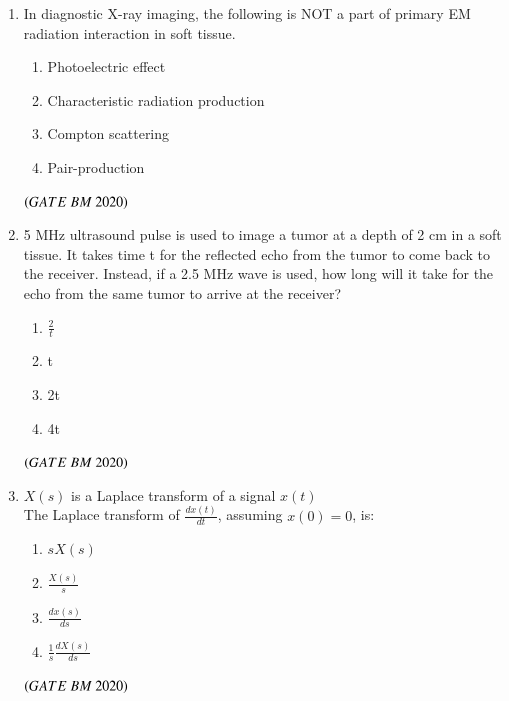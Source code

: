 \documentclass[journal,12pt,onecolumn]{IEEEtran}
\theoremstyle{remark}
\begin{document}
\begin{enumerate}
\item In diagnostic X-ray imaging, the following is NOT a part of primary EM radiation interaction in soft tissue.
\begin{enumerate}[label=\alph*)] 
\item\hspace{0.5cm}Photoelectric effect
\item\hspace{0.5cm}Characteristic radiation production
\item\hspace{0.5cm}Compton scattering
\item\hspace{0.5cm}Pair-production
\end{enumerate}
\hfill $\brak{GATE\ BM\ 2020}$\\
 
\item 5 MHz ultrasound pulse is used to image a tumor at a depth of 2 cm in a soft tissue. It takes time t for the reflected echo from the tumor to come back to the receiver. Instead, if a 2.5 MHz wave is used, how long will it take for the echo from the same tumor to arrive at the receiver?
\begin{enumerate}[label=\alph*)] 
\item\hspace{0.5cm}$\frac{2}{t}$
\item\hspace{0.5cm}t
\item\hspace{0.5cm}2t
\item\hspace{0.5cm}4t
\end{enumerate}
 \hfill $\brak{GATE\ BM\ 2020}$\\
 
\item $X(s)$ is a Laplace transform of a signal $x(t)$\\
The Laplace transform of $\frac{dx(t)}{dt}$, assuming $x(0) = 0$, is:
\begin{enumerate}[label=\alph*)] 
\item\hspace{0.5cm}$sX(s)$
\item\hspace{0.5cm}$\frac{X(s)}{s}$
\item\hspace{0.5cm}$\frac{dx(s)}{ds}$
\item\hspace{0.5cm}$\frac{1}{s} \frac{dX(s)}{ds}$
\end{enumerate}
 \hfill $\brak{GATE\ BM\ 2020}$\\
 

\end{enumerate}
\end{document}
